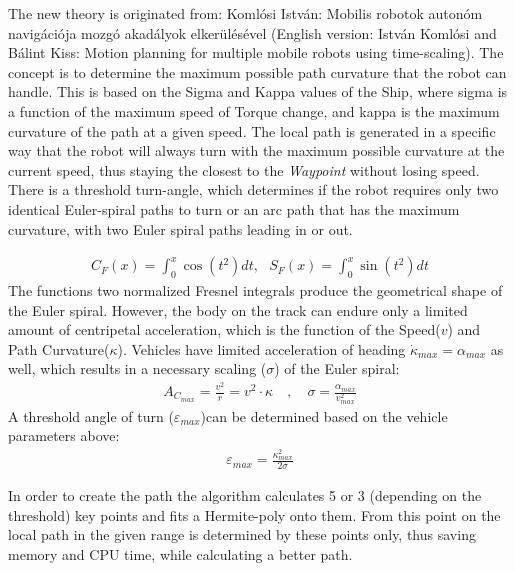 The new theory is originated from: Koml\'osi Istv\'an: Mobilis robotok auton\'om navig\'aci\'oja mozg\'o akad\'alyok elker\"ul\'es\'evel (English version: Istv\'an Koml\'osi and B\'alint Kiss: Motion planning for multiple mobile robots using time-scaling).
The concept is to determine the maximum possible path curvature that the robot can handle. This is based on the Sigma and Kappa values of the Ship, where sigma is a function of the maximum speed of Torque change, and kappa is the maximum curvature of the path at a given speed. The local path is generated in a specific way that the robot will always turn with the maximum possible curvature at the current speed, thus staying the closest to the \emph{Waypoint} without losing speed. There is a threshold turn-angle, which determines if the robot requires only two identical Euler-spiral paths to turn or an arc path that has the maximum curvature, with two Euler spiral paths leading in or out.

\begin{align}
C_F(x) = \int_0^x \cos(t^2)dt,\,\,\,\,S_F(x) = \int_0^x \sin(t^2)dt
\label{eq:fresnel}
\end{align}
The functions two normalized Fresnel integrals produce the geometrical shape of the Euler spiral. However, the body on the track can endure only a limited amount of centripetal acceleration, which is the function of the Speed($v$) and Path Curvature($\kappa$). Vehicles have limited acceleration of heading $\dot{\kappa}_{max} = \alpha_{max}$ as well, which results in a necessary scaling ($\sigma$) of the Euler spiral:
\begin{align}
A_{C_{max}} = \frac{v^2}{r} = v^2 \cdot \kappa \quad , \quad \sigma = \frac{\alpha_{max}}{v^2_{max}}
\end{align}
A threshold angle of turn ($\varepsilon_{max}$)can be determined based on the vehicle parameters above:
\begin{align}
\varepsilon_{max} = \frac{\kappa^2_{max}}{2\sigma}
\end{align}

In order to create the path the algorithm calculates 5 or 3 (depending on the threshold) key points and fits a Hermite-poly onto them. From this point on the local path in the given range is determined by these points only, thus saving memory and CPU time, while calculating a better path.


